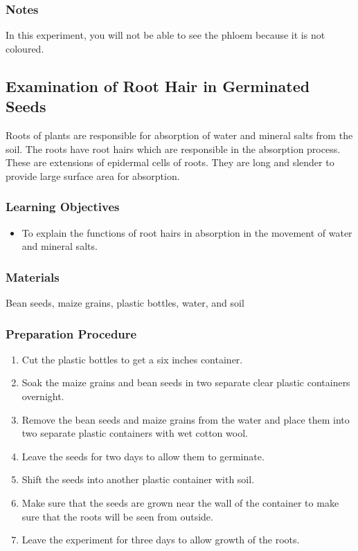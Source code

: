 \subsubsection*{Notes}
In this experiment, you will not be able to see the phloem because it is not coloured.

\subsection{Examination of Root Hair in Germinated Seeds}

Roots of plants are responsible for absorption of water and mineral salts from the soil. The roots have root hairs which are responsible in the absorption process. These are extensions of epidermal cells of roots. They are long and slender to provide large surface area for absorption.

\subsubsection*{Learning Objectives}
\begin{itemize}
\item{To explain the functions of root hairs in absorption in the movement of water and mineral salts.}
\end{itemize}



\subsubsection*{Materials}
Bean seeds, maize grains, plastic bottles, water, and soil

\subsubsection*{Preparation Procedure}
\begin{enumerate}
\item{Cut the plastic bottles to get a six inches container.}
\item{Soak the maize grains and bean seeds in two separate clear plastic containers overnight.}
\item{Remove the bean seeds and maize grains from the water and place them into two separate plastic containers with wet cotton wool.}
\item{Leave the seeds for two days to allow them to germinate.}
\item{Shift the seeds into another plastic container with soil.}
\item{Make sure that the seeds are grown near the wall of the container to make sure that the roots will be seen from outside.}
\item{Leave the experiment for three days to allow growth of the roots.}
\end{enumerate}

